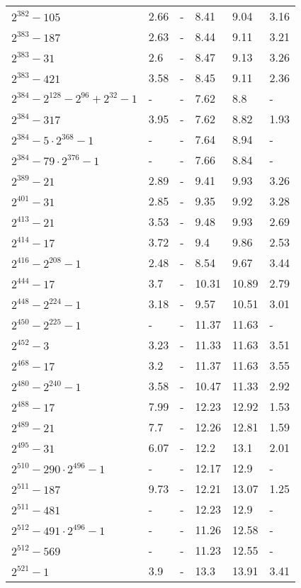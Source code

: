 \documentclass[conference,letterpaper]{IEEEtran}
\begin{document}
\begin{xtabular}{|l|p{0.6cm}@{}|p{0.75cm}@{}|p{0.75cm}@{}|p{0.7cm}@{}|p{0.75cm}@{}|}
	$2^{382}-105$ & 2.66 & - & 8.41 & 9.04 & 3.16 \\
	$2^{383}-187$ & 2.63 & - & 8.44 & 9.11 & 3.21 \\
	$2^{383}-31$ & 2.6 & - & 8.47 & 9.13 & 3.26 \\
	$2^{383}-421$ & 3.58 & - & 8.45 & 9.11 & 2.36 \\
	$2^{384}-2^{128}-2^{96}+2^{32}-1$ & - & - & 7.62 & 8.8 & - \\
	$2^{384}-317$ & 3.95 & - & 7.62 & 8.82 & 1.93 \\
	$2^{384}-5\cdot 2^{368}-1$ & - & - & 7.64 & 8.94 & - \\
	$2^{384}-79\cdot 2^{376}-1$ & - & - & 7.66 & 8.84 & - \\
	$2^{389}-21$ & 2.89 & - & 9.41 & 9.93 & 3.26 \\
	$2^{401}-31$ & 2.85 & - & 9.35 & 9.92 & 3.28 \\
	$2^{413}-21$ & 3.53 & - & 9.48 & 9.93 & 2.69 \\
	$2^{414}-17$ & 3.72 & - & 9.4 & 9.86 & 2.53 \\
	$2^{416}-2^{208}-1$ & 2.48 & - & 8.54 & 9.67 & 3.44 \\
	$2^{444}-17$ & 3.7 & - & 10.31 & 10.89 & 2.79 \\
	$2^{448}-2^{224}-1$ & 3.18 & - & 9.57 & 10.51 & 3.01 \\
	$2^{450}-2^{225}-1$ & - & - & 11.37 & 11.63 & - \\
	$2^{452}-3$ & 3.23 & - & 11.33 & 11.63 & 3.51 \\
	$2^{468}-17$ & 3.2 & - & 11.37 & 11.63 & 3.55 \\
	$2^{480}-2^{240}-1$ & 3.58 & - & 10.47 & 11.33 & 2.92 \\
	$2^{488}-17$ & 7.99 & - & 12.23 & 12.92 & 1.53 \\
	$2^{489}-21$ & 7.7 & - & 12.26 & 12.81 & 1.59 \\
	$2^{495}-31$ & 6.07 & - & 12.2 & 13.1 & 2.01 \\
	$2^{510}-290\cdot 2^{496}-1$ & - & - & 12.17 & 12.9 & - \\
	$2^{511}-187$ & 9.73 & - & 12.21 & 13.07 & 1.25 \\
	$2^{511}-481$ & - & - & 12.23 & 12.9 & - \\
	$2^{512}-491\cdot 2^{496}-1$ & - & - & 11.26 & 12.58 & - \\
	$2^{512}-569$ & - & - & 11.23 & 12.55 & - \\
	$2^{521}-1$ & 3.9 & - & 13.3 & 13.91 & 3.41 \\
\hline
\end{xtabular}
\end{document}
